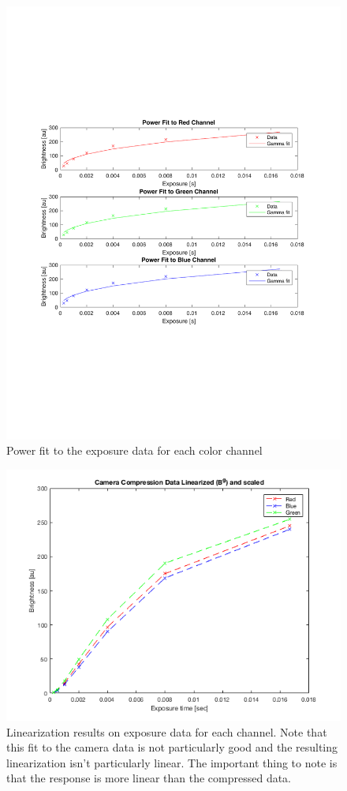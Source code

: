 \documentclass[a4paper]{article}
\begin{document}
\begin{figure}[htb!]
    \begin{center}
        \includegraphics[width=4 in]{powerfit.pdf}
	 \end{center}
    \caption{Power fit to the exposure data for each color channel} 
    \label{fig:powerfit}
\end{figure}

\begin{figure}[htb!]
    \begin{center}
        \includegraphics[width=5in]{linearExposure.png}
	 \end{center}
    \caption{Linearization results on exposure data for each channel.  Note that this fit to the camera data is not particularly good and the resulting linearization isn't particularly linear.  The important thing to
    note is that the response is more linear than the compressed data. } 
    \label{fig:linEx}
\end{figure}
\FloatBarrier
\end{document}
